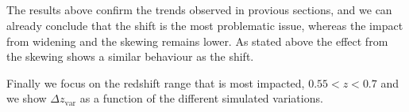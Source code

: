 \documentclass{article}
\begin{document}
    \begin{center}
    \end{center}
    { \hspace*{\fill} \\}
    
    \begin{center}
    \end{center}
    { \hspace*{\fill} \\}
    
    \begin{center}
    \end{center}
    { \hspace*{\fill} \\}
    
    \begin{center}
    \end{center}
    { \hspace*{\fill} \\}
    
    The results above confirm the trends observed in provious sections, and
we can already conclude that the shift is the most problematic issue,
whereas the impact from widening and the skewing remains lower. As
stated above the effect from the skewing shows a similar behaviour as
the shift.

Finally we focus on the redshift range that is most impacted,
\(0.55 < z < 0.7\) and we show \(\Delta z_\mathrm{var}\) as a function
of the different simulated variations.


    \begin{center}
    \end{center}
    { \hspace*{\fill} \\}
    
    \begin{center}
    \end{center}
    { \hspace*{\fill} \\}
    
\end{document}
